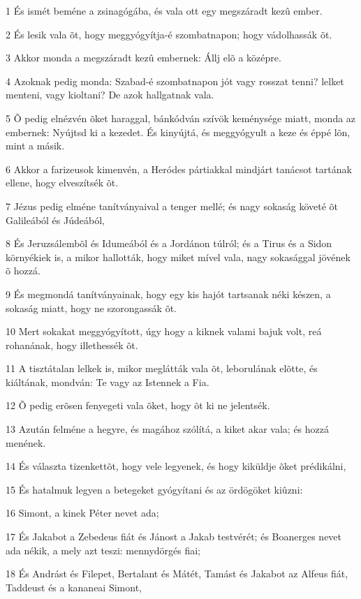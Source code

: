 \par 1 És ismét beméne a zsinagógába, és vala ott egy megszáradt kezû ember.
\par 2 És lesik vala õt, hogy meggyógyítja-é szombatnapon; hogy vádolhassák õt.
\par 3 Akkor monda a megszáradt kezû embernek: Állj elõ a középre.
\par 4 Azoknak pedig monda: Szabad-é szombatnapon jót vagy rosszat tenni? lelket menteni, vagy kioltani? De azok hallgatnak vala.
\par 5 Õ pedig elnézvén õket haraggal, bánkódván szívök keménysége miatt, monda az embernek: Nyújtsd ki a kezedet. És kinyújtá, és meggyógyult a keze és éppé lõn, mint a másik.
\par 6 Akkor a farizeusok kimenvén, a Heródes pártiakkal mindjárt tanácsot tartának ellene, hogy elveszítsék õt.
\par 7 Jézus pedig elméne tanítványaival a tenger mellé; és nagy sokaság követé õt Galileából és Júdeából,
\par 8 És Jeruzsálembõl és Idumeából és a Jordánon túlról; és a Tirus és a Sidon környékiek is, a mikor hallották, hogy miket mível vala, nagy sokasággal jövének õ hozzá.
\par 9 És megmondá tanítványainak, hogy egy kis hajót tartsanak néki készen, a sokaság miatt, hogy ne szorongassák õt.
\par 10 Mert sokakat meggyógyított, úgy hogy a kiknek valami bajuk volt, reá rohanának, hogy illethessék õt.
\par 11 A tisztátalan lelkek is, mikor meglátták vala õt, leborulának elõtte, és kiáltának, mondván: Te vagy az Istennek a Fia.
\par 12 Õ pedig erõsen fenyegeti vala õket, hogy õt ki ne jelentsék.
\par 13 Azután felméne a hegyre, és magához szólítá, a kiket akar vala; és hozzá menének.
\par 14 És választa tizenkettõt, hogy vele legyenek, és hogy kiküldje õket prédikálni,
\par 15 És hatalmuk legyen a betegeket gyógyítani és az ördögöket kiûzni:
\par 16 Simont, a kinek Péter nevet ada;
\par 17 És Jakabot a Zebedeus fiát és Jánost a Jakab testvérét; és Boanerges nevet ada nékik, a mely azt teszi: mennydörgés fiai;
\par 18 És Andrást és Filepet, Bertalant és Mátét, Tamást és Jakabot az Alfeus fiát, Taddeust és a kananeai Simont,
